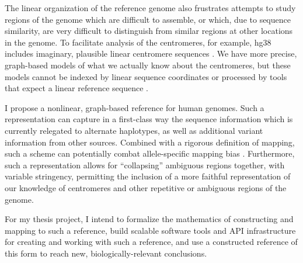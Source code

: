 \documentclass[11pt,proposal]{ucthesis}
\begin{document}

The linear organization of the reference genome also frustrates attempts to study regions of the genome which are difficult to assemble, or which, due to sequence similarity, are very difficult to distinguish from similar regions at other locations in the genome. To facilitate analysis of the centromeres, for example, hg38 includes imaginary, plausible linear centromere sequences \cite{karolchik2014new}. We have more precise, graph-based models of what we actually know about the centromeres, but these models cannot be indexed by linear sequence coordinates or processed by tools that expect a linear reference sequence \cite{miga2014centromere}.

I propose a nonlinear, graph-based reference for human genomes. Such a representation can capture in a first-class way the sequence information which is currently relegated to alternate haplotypes, as well as additional variant information from other sources. Combined with a rigorous definition of mapping, such a scheme can potentially combat allele-specific mapping bias \cite{degner2009effect}. Furthermore, such a representation allows for ``collapsing'' ambiguous regions together, with variable stringency, permitting the inclusion of a more faithful representation of our knowledge of centromeres and other repetitive or ambiguous regions of the genome.

For my thesis project, I intend to formalize the mathematics of constructing and mapping to such a reference, build scalable software tools and API infrastructure for creating and working with such a reference, and use a constructed reference of this form to reach new, biologically-relevant conclusions.


    
    
    

    
    
\end{document}
